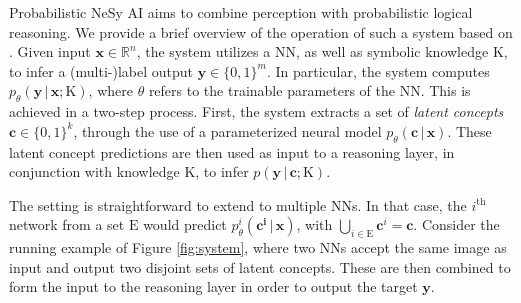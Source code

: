 Probabilistic NeSy AI aims to combine perception with probabilistic logical reasoning. We provide a brief overview of the operation of such a system based on \cite{marconato2024bears}. Given input $\boldsymbol{x} \in \mathbb{R}^n$, the system utilizes a NN, as well as symbolic knowledge $\mathrm{K}$, to infer a (multi-)label output $\boldsymbol{y} \in \{0, 1\}^m$. In particular, the system computes $p_\theta(\boldsymbol{y} \,\vert\, \boldsymbol{x}; \mathrm{K})$, where $\theta$ refers to the trainable parameters of the NN. This is achieved in a two-step process. First, the system extracts a set of \textit{latent concepts} $\boldsymbol{c} \in \{0, 1\}^k$, through the use of a parameterized neural model $p_\theta(\boldsymbol{c} \,\vert\, \boldsymbol{x})$. These latent concept predictions are then used as input to a reasoning layer, in conjunction with knowledge $\mathrm{K}$, to infer $p(\boldsymbol{y} \,\vert\, \boldsymbol{c}; \mathrm{K})$.

The setting is straightforward to extend to multiple NNs. In that case, the $i^{\text{th}}$ network from a set $\mathrm{E}$ would predict $p_\theta^i(\boldsymbol{c^i} \,\vert\, \boldsymbol{x})$, with $\bigcup_{i \in \mathrm{E}} \boldsymbol{c}^i = \boldsymbol{c}$. Consider the running example of Figure \ref{fig:system}, where two NNs accept the same image as input and output two disjoint sets of latent concepts. These are then combined to form the input to the reasoning layer in order to output the target $\boldsymbol{y}$.